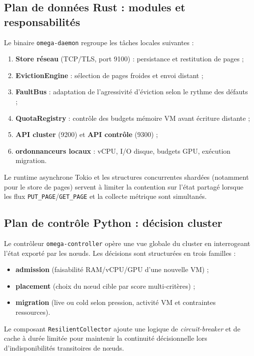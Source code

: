 \subsection{Plan de données Rust : modules et responsabilités}

Le binaire \texttt{omega-daemon} regroupe les tâches locales suivantes :
\begin{enumerate}
    \item \textbf{Store réseau} (TCP/TLS, port 9100) : persistance et restitution de pages ;
    \item \textbf{EvictionEngine} : sélection de pages froides et envoi distant ;
    \item \textbf{FaultBus} : adaptation de l’agressivité d’éviction selon le rythme des défauts ;
    \item \textbf{QuotaRegistry} : contrôle des budgets mémoire VM avant écriture distante ;
    \item \textbf{API cluster} (9200) et \textbf{API contrôle} (9300) ;
    \item \textbf{ordonnanceurs locaux} : vCPU, I/O disque, budgets GPU, exécution migration.
\end{enumerate}

Le runtime asynchrone Tokio et les structures concurrentes shardées (notamment pour le store de pages) servent à limiter la contention sur l’état partagé lorsque les flux \texttt{PUT\_PAGE}/\texttt{GET\_PAGE} et la collecte métrique sont simultanés.

\subsection{Plan de contrôle Python : décision cluster}

Le contrôleur \texttt{omega-controller} opère une vue globale du cluster en interrogeant l’état exporté par les nœuds. Les décisions sont structurées en trois familles :
\begin{itemize}
    \item \textbf{admission} (faisabilité RAM/vCPU/GPU d’une nouvelle VM) ;
    \item \textbf{placement} (choix du nœud cible par score multi-critères) ;
    \item \textbf{migration} (live ou cold selon pression, activité VM et contraintes ressources).
\end{itemize}

Le composant \texttt{ResilientCollector} ajoute une logique de \emph{circuit-breaker} et de cache à durée limitée pour maintenir la continuité décisionnelle lors d’indisponibilités transitoires de nœuds.

